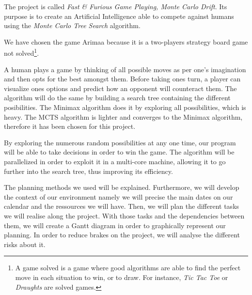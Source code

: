 The project is called \emph{Fast \& Furious Game Playing, Monte Carlo Drift}. Its purpose is to create an Artificial Intelligence able to compete against humans using the \emph{Monte Carlo Tree Search} algorithm.

We have chosen the game Arimaa because it is a two-players strategy board game not solved\footnote{A game solved is a game where good algorithms are able to find the perfect move in each situation to win, or to draw. For instance, \textit{Tic Tac Toe} or \textit{Draughts} are solved games.}.

A human plays a game by thinking of all possible moves as per one's imagination and then opts for the best amongst them. Before taking ones turn, a player can visualize ones options and predict how an opponent will counteract them. The algorithm will do the same by building a search tree containing the different posibilities. The Minimax algorithm does it by exploring all possibilities, which is heavy. The MCTS algorithm is lighter and converges to the Minimax algorithm, therefore it has been chosen for this project.

By exploring the numerous random possibilities at any one time, our program will be able to take decisions in order to win the game.
The algorithm will be parallelized in order to exploit it in a multi-core machine, allowing it to go further into the search tree, thus improving its efficiency.

The planning methods we used will be explained. Furthermore, we will develop the context of our environment namely we will precise the main dates on our calendar and the ressources we will have.  Then, we will plan the different tasks we will realise along the project. With those tasks and the dependencies between them, we will create a Gantt diagram in order to graphically represent our planning. In order to reduce brakes on the project, we will analyse the different risks about it.
